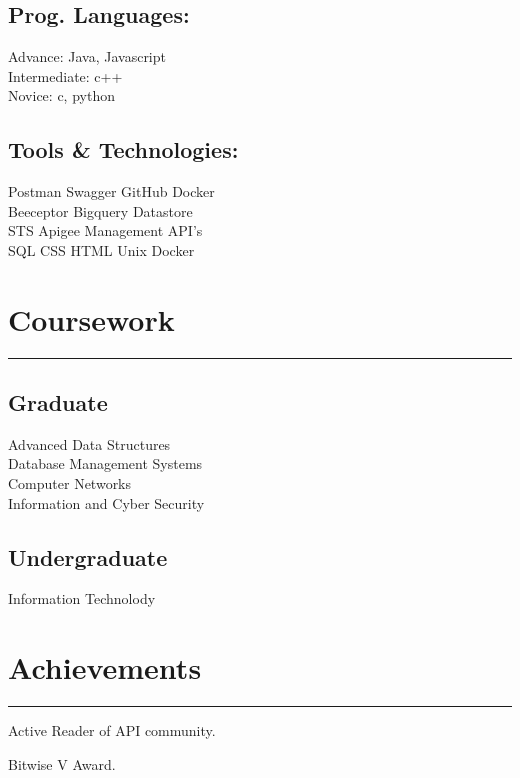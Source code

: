 \documentclass[]{deedy-resume-reversed}
\newcommand{\mysection}[2]{%
    \section{#1\hspace{0.5em}#2}
}
\begin{document}
\begin{minipage}[t]{0.33\textwidth}
\subsection{Prog. Languages:}
 \textbullet{} Advance: Java, Javascript\\ 
 \textbullet{} Intermediate: c++\\ 
 \textbullet{} Novice: c, python \\
\sectionsep
\subsection{Tools \& Technologies:}
 \textbullet{} Postman \textbullet{} Swagger \textbullet{} GitHub \textbullet{} Docker\\\textbullet{} Beeceptor \textbullet{} Bigquery \textbullet{} Datastore\\ \textbullet{} STS \textbullet{} Apigee  \textbullet{} Management API’s\\
 \textbullet{} SQL \textbullet{} CSS \textbullet{} HTML \textbullet{} Unix \textbullet{} Docker
\sectionsep


\mysection{\faGraduationCap}{Coursework}
\rule{\textwidth}{0.4pt}
\subsection{Graduate}
Advanced Data Structures \\
Database Management Systems\\
Computer Networks \\
Information and Cyber Security \\
\sectionsep

\subsection{Undergraduate}
Information Technolody\\
\sectionsep


\mysection{\faTrophy }{Achievements}
\rule{\textwidth}{0.4pt}
\begin{tightemize}
\item Active Reader of API community.
\item Bitwise V Award.
\end{tightemize}
\sectionsep


\end{minipage}
\end{document}
